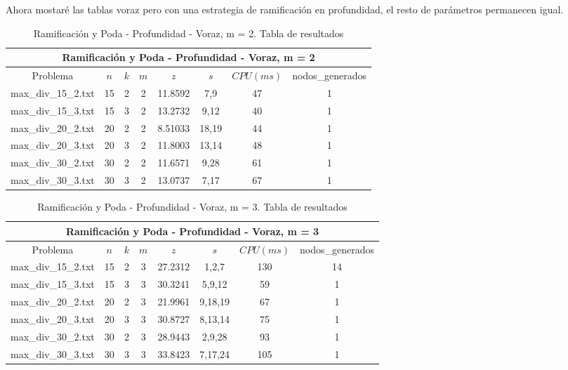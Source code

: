 \clearpage
Ahora mostaré las tablas voraz pero con una estrategia de ramificación en profundidad, el resto de parámetros permanecen igual.

   \begin{table}[h]
   {\small
   \begin{center}
   \begin{tabular}{cccccccc}
      \multicolumn{8}{c}{Ramificación y Poda - Profundidad - Voraz, m = 2} \\
      \hline
      Problema & $n$ & $k$ & $m$ & $z$ & $s$ & $CPU(ms)$ & nodos\_generados \\
      \hline
      max\_div\_15\_2.txt & 15 & 2 & 2 & 11.8592 & 7,9 & 47 & 1 \\
      max\_div\_15\_3.txt & 15 & 3 & 2 & 13.2732 & 9,12 & 40 & 1 \\
      max\_div\_20\_2.txt & 20 & 2 & 2 & 8.51033 & 18,19 & 44 & 1 \\
      max\_div\_20\_3.txt & 20 & 3 & 2 & 11.8003 & 13,14 & 48 & 1 \\
      max\_div\_30\_2.txt & 30 & 2 & 2 & 11.6571 & 9,28 & 61 & 1 \\
      max\_div\_30\_3.txt & 30 & 3 & 2 & 13.0737 & 7,17 & 67 & 1 \\
      \hline
   \end{tabular}
   \end{center}
   }
   \caption{Ramificación y Poda - Profundidad - Voraz, m = 2. Tabla de resultados}
   \end{table}

   \begin{table}[h]
   {\small
   \begin{center}
   \begin{tabular}{cccccccc}
      \multicolumn{8}{c}{Ramificación y Poda - Profundidad - Voraz, m = 3} \\
      \hline
      Problema & $n$ & $k$ & $m$ & $z$ & $s$ & $CPU(ms)$ & nodos\_generados \\
      \hline
      max\_div\_15\_2.txt & 15 & 2 & 3 & 27.2312 & 1,2,7 & 130 & 14 \\
      max\_div\_15\_3.txt & 15 & 3 & 3 & 30.3241 & 5,9,12 & 59 & 1 \\
      max\_div\_20\_2.txt & 20 & 2 & 3 & 21.9961 & 9,18,19 & 67 & 1 \\
      max\_div\_20\_3.txt & 20 & 3 & 3 & 30.8727 & 8,13,14 & 75 & 1 \\
      max\_div\_30\_2.txt & 30 & 2 & 3 & 28.9443 & 2,9,28 & 93 & 1 \\
      max\_div\_30\_3.txt & 30 & 3 & 3 & 33.8423 & 7,17,24 & 105 & 1 \\
      \hline
   \end{tabular}
   \end{center}
   }
   \caption{Ramificación y Poda - Profundidad - Voraz, m = 3. Tabla de resultados}
   \end{table}

